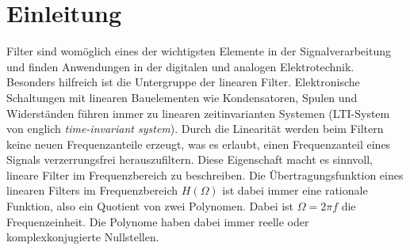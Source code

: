 \section{Einleitung}

Filter sind womöglich eines der wichtigsten Elemente in der Signalverarbeitung und finden Anwendungen in der digitalen und analogen Elektrotechnik.
Besonders hilfreich ist die Untergruppe der linearen Filter.
Elektronische Schaltungen mit linearen Bauelementen wie Kondensatoren, Spulen und Widerständen führen immer zu linearen zeitinvarianten Systemen (LTI-System von englich \textit{time-invariant system}).
Durch die Linearität werden beim Filtern keine neuen Frequenzanteile erzeugt, was es erlaubt, einen Frequenzanteil eines Signals verzerrungsfrei herauszufiltern.
Diese Eigenschaft macht es sinnvoll, lineare Filter im Frequenzbereich zu beschreiben.
Die Übertragungsfunktion eines linearen Filters im Frequenzbereich $H(\Omega)$ ist dabei immer eine rationale Funktion, also ein Quotient von zwei Polynomen.
Dabei ist $\Omega = 2 \pi f$ die Frequenzeinheit.
Die Polynome haben dabei immer reelle oder komplexkonjugierte Nullstellen.

